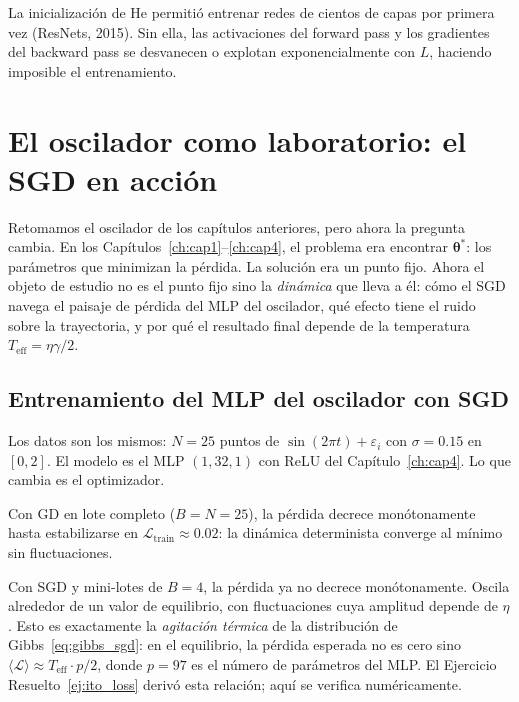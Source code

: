 La inicialización de He permitió entrenar redes de cientos de capas por
primera vez (ResNets, 2015). Sin ella, las activaciones del forward pass
y los gradientes del backward pass se desvanecen o explotan
exponencialmente con $L$, haciendo imposible el entrenamiento.

\section{El oscilador como laboratorio: el SGD en acción}
\label{sec:oscilador5}


Retomamos el oscilador de los capítulos anteriores, pero ahora la pregunta
cambia. En los Capítulos~\ref{ch:cap1}--\ref{ch:cap4}, el problema era
encontrar $\bm{\theta}^*$: los parámetros que minimizan la pérdida. La
solución era un punto fijo. Ahora el objeto de estudio no es el punto fijo
sino la \emph{dinámica} que lleva a él: cómo el SGD navega el paisaje de
pérdida del MLP del oscilador, qué efecto tiene el ruido sobre la
trayectoria, y por qué el resultado final depende de la temperatura
$T_{\text{eff}} = \eta\gamma/2$.

\subsection{Entrenamiento del MLP del oscilador con SGD}
\label{subsec:osc_sgd}

Los datos son los mismos: $N = 25$ puntos de $\sin(2\pi t) + \varepsilon_i$
con $\sigma = 0.15$ en $[0, 2]$. El modelo es el MLP $(1, 32, 1)$ con ReLU
del Capítulo~\ref{ch:cap4}. Lo que cambia es el optimizador.

Con GD en lote completo ($B = N = 25$), la pérdida decrece monótonamente
hasta estabilizarse en $\mathcal{L}_{\text{train}} \approx 0.02$: la
dinámica determinista converge al mínimo sin fluctuaciones.

Con SGD y mini-lotes de $B = 4$, la pérdida ya no decrece monótonamente.
Oscila alrededor de un valor de equilibrio, con fluctuaciones cuya amplitud
depende de $\eta$. Esto es exactamente la \emph{agitación térmica} de la
distribución de Gibbs~\eqref{eq:gibbs_sgd}: en el equilibrio, la pérdida
esperada no es cero sino $\langle\mathcal{L}\rangle \approx
T_{\text{eff}} \cdot p/2$, donde $p = 97$ es el número de parámetros del
MLP. El Ejercicio Resuelto~\ref{ej:ito_loss} derivó esta relación; aquí
se verifica numéricamente.

